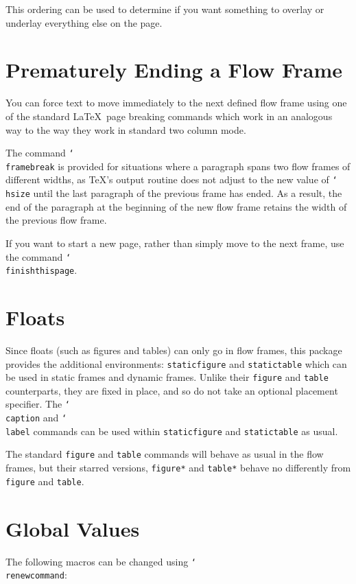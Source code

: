 \documentclass[a4paper,twoside]{report}
\newcommand{\cmdname}[1]{\texttt{\char`\\#1}}
\newcommand{\env}[1]{\texttt{#1}}
\begin{document}
This ordering can be used to determine if you want something
to overlay or underlay everything else on the page.

\section{Prematurely Ending a Flow Frame}

You can force text to move immediately to the next defined
flow frame using one of the standard \LaTeX\ page breaking commands
which  work in an analogous way to the way they
work in standard two column mode.

The command \cmdname{framebreak} is provided for situations
where a paragraph spans two flow frames
of different widths, as \TeX's output routine does not
adjust to the new value of \cmdname{hsize} until the last
paragraph of the previous frame has ended. As a
result, the end of the paragraph at the beginning of the new
flow frame retains the width of the previous flow frame.

If you want to start a new page, rather than simply move to the
next frame, use the command\newline
\cmdname{finishthispage}.

\section{Floats}

Since floats (such as figures and tables) can only go in
{flow frames}, this package provides
the additional environments:
\env{staticfigure} and
\env{statictable} which can be used in static frames
and dynamic frames. Unlike their \env{figure} and
\env{table} counterparts, they are fixed in place, and
so do not take an optional placement specifier. The
\cmdname{caption} and \cmdname{label} commands can
be used within \env{staticfigure} and \env{statictable} as
usual.

The standard \env{figure} and \env{table} commands will
behave as usual in the flow frames, but their starred versions,
\env{figure*} and \env{table*} behave no differently
from \env{figure} and \env{table}.

\section{Global Values}

The following macros can be changed using \cmdname{renewcommand}:
\end{document}
